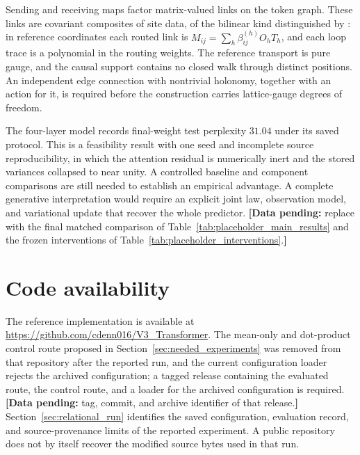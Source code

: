 \documentclass[twoside,11pt]{article}
\providecommand{\datapending}[1]{{\color{red!60!black}\textbf{[Data pending:} #1\textbf{]}}}
\begin{document}
Sending and receiving maps factor matrix-valued links on the token graph. These links are covariant composites of site data, of the bilinear kind distinguished by \citet[Sec.~I]{Wetterich2014LinearLattice}: in reference coordinates each routed link is $M_{ij}=\sum_h\beta_{ij}^{(h)}O_hT_h$, and each loop trace is a polynomial in the routing weights. The reference transport is pure gauge, and the causal support contains no closed walk through distinct positions. An independent edge connection with nontrivial holonomy, together with an action for it, is required before the construction carries lattice-gauge degrees of freedom.

The four-layer model records final-weight test perplexity $31.04$ under its saved protocol. This is a feasibility result with one seed and incomplete source reproducibility, in which the attention residual is numerically inert and the stored variances collapsed to near unity. A controlled baseline and component comparisons are still needed to establish an empirical advantage. A complete generative interpretation would require an explicit joint law, observation model, and variational update that recover the whole predictor.
\datapending{replace with the final matched comparison of Table~\ref{tab:placeholder_main_results} and the frozen interventions of Table~\ref{tab:placeholder_interventions}.} %

\section*{Code availability}
The reference implementation is available at \url{https://github.com/cdenn016/V3_Transformer}. The mean-only and dot-product control route proposed in Section~\ref{sec:needed_experiments} was removed from that repository after the reported run, and the current configuration loader rejects the archived configuration; a tagged release containing the evaluated route, the control route, and a loader for the archived configuration is required.
\datapending{tag, commit, and archive identifier of that release.} %
Section~\ref{sec:relational_run} identifies the saved configuration, evaluation record, and source-provenance limits of the reported experiment. A public repository does not by itself recover the modified source bytes used in that run.



\end{document}
